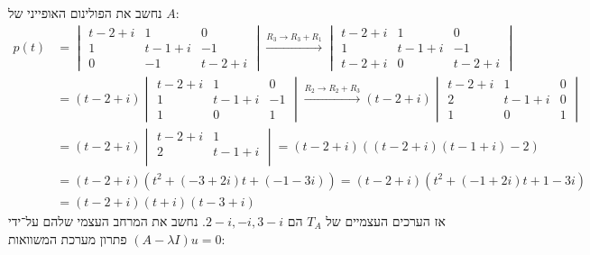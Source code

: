 נחשב את הפולינום האופייני של $A$:
\begin{align*}
	p(t) 
	& = 
	\begin{vmatrix}
		t - 2 + i & 1 & 0 \\
		1 & t - 1 + i & -1 \\
		0 & -1 & t - 2 + i
	\end{vmatrix}
	\xrightarrow{R_3 \to R_3 + R_1} 
	\begin{vmatrix}
		t - 2 + i & 1 & 0 \\
		1 & t - 1 + i & -1 \\
		t - 2 + i & 0 & t - 2 + i
	\end{vmatrix} \\
	& = 
	(t - 2 + i)
	\begin{vmatrix}
		t - 2 + i & 1 & 0 \\
		1 & t - 1 + i & -1 \\
		1 & 0 & 1
	\end{vmatrix}
	\xrightarrow{R_2 \to R_2 + R_3}
	(t - 2 + i)
	\begin{vmatrix}
		t - 2 + i & 1 & 0 \\
		2 & t - 1 + i & 0 \\
		1 & 0 & 1
	\end{vmatrix} \\
	& =
	(t - 2 + i)
	\begin{vmatrix}
		t - 2 + i & 1 \\
		2 & t - 1 + i \\
	\end{vmatrix}
	= (t - 2 + i) ((t - 2 + i) (t - 1 + i) - 2) \\
	& = (t - 2 + i)(t^2 + (-3 + 2i) t + (-1 - 3i))
	= (t - 2 + i)(t^2 + (-1 + 2i) t + 1 - 3i) \\
	& = (t - 2 + i)(t + i)(t - 3 + i)
\end{align*}
אז הערכים העצמיים של $T_A$ הם $2 - i, -i, 3 - i$. נחשב את המרחב העצמי שלהם על־ידי פתרון מערכת המשוואות $(A - \lambda I)u = 0$:
